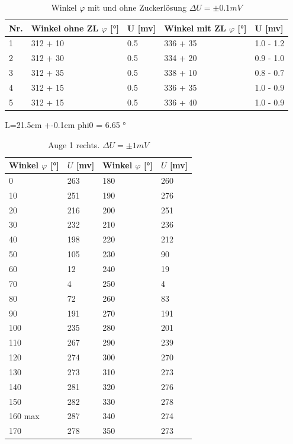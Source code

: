 \documentclass[12pt,a4paper,twoside]{article}
\begin{document}
\begin{table}[H]
    \centering
    \caption{Winkel $\varphi$ mit und ohne Zuckerlösung $\Delta U = \pm 0.1mV$}
    \label{tab:Messdaten Zuckerlösung}
    \begin{tabular}{| l | l | l | l | l |}
        \hline
        Nr. & Winkel ohne ZL $\varphi$ [°] & U [mv] & Winkel mit ZL $\varphi$ [°] & U [mv] \\
        \hline
        1   & 312 + 10  & 0.5   & 336 + 35 & 1.0 - 1.2 \\
        2   & 312 + 30  & 0.5   & 334 + 20 & 0.9 - 1.0 \\
        3   & 312 + 35  & 0.5   & 338 + 10 & 0.8 - 0.7 \\
        4   & 312 + 15  & 0.5   & 336 + 35 & 1.0 - 0.9 \\
        5   & 312 + 15  & 0.5   & 336 + 40 & 1.0 - 0.9 \\
        \hline
    \end{tabular}
\end{table}

L=21.5cm +-0.1cm
phi0 = 6.65 °

\begin{table}[H]
    \centering
    \caption{Auge 1 rechts.  $\Delta U = \pm 1mV$}
    \label{tab:Messdaten Auge rechts}
    \begin{tabular}{| l | l | l | l |}
        \hline
        Winkel $\varphi$ [°] & $U$ [mv] & Winkel $\varphi$ [°] & $U$ [mv] \\
        \hline
        0    & 263  & 180   & 260  \\
        10   & 251  & 190   & 276  \\
        20   & 216  & 200   & 251  \\
        30   & 232  & 210   & 236  \\
        40   & 198  & 220   & 212  \\
        50   & 105  & 230   & 90  \\
        60   & 12   & 240   & 19  \\
        70   & 4    & 250   & 4  \\
        80   & 72   & 260   & 83  \\
        90   & 191  & 270   & 191  \\
        100  & 235  & 280   & 201  \\
        110  & 267  & 290   & 239  \\
        120  & 274  & 300   & 270  \\
        130  & 273  & 310   & 273  \\
        140  & 281  & 320   & 276  \\
        150  & 282  & 330   & 278  \\
        160 max  & 287  & 340   & 274  \\
        170  & 278  & 350   & 273  \\
        \hline
    \end{tabular}
\end{table}
\end{document}
